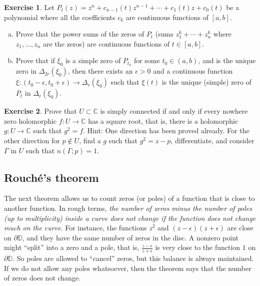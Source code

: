 \documentclass[12pt,openany]{book}
\newcommand{\C}{{\mathbb{C}}}
\newcommand{\D}{{\mathbb{D}}}
\newcommand{\myquote}[1]{``#1''}
\theoremstyle{plain}
\theoremstyle{remark}
\theoremstyle{definition}
\newenvironment{exbox}{%
    \def\FrameCommand{\vrule width 1pt \relax\hspace{10pt}}%
    \MakeFramed{\advance\hsize-\width\FrameRestore}%
}{%
    \endMakeFramed
}
\newenvironment{exparts}{%
    \leavevmode\begin{enumerate}[a),noitemsep,topsep=0pt,parsep=0pt,partopsep=0pt]
}{%
    \end{enumerate}
}
\theoremstyle{exercise}
\newtheorem{exercise}{Exercise}[section]
\theoremstyle{example}
\begin{document}
\begin{exbox}
\begin{exercise}
Let $P_t(z) = z^n + c_{n-1}(t) z^{n-1} + \cdots + c_1(t) z + c_0(t)$
be a polynomial where all the coefficients $c_k$ are continuous functions
of $[a,b]$.
\begin{exparts}
\item
Prove that the power sums of the zeros of $P_t$
(sums $z_1^k+\cdots+z_n^k$ where $z_1,\ldots,z_n$ are the zeros)
are
continuous functions of $t \in [a,b]$.
\item
Prove that if $\xi_0$ is a simple zero of $P_{t_0}$ for some $t_0 \in (a,b)$,
and is the unique zero in
$\Delta_{2r}(\xi_0)$, then
there exists an $\epsilon > 0$ and a continuous function $\xi \colon
(t_0-\epsilon,t_0+\epsilon) \to \Delta_r(\xi_0)$ such that $\xi(t)$
is the unique (simple) zero of $P_t$ in $\Delta_r(\xi_0)$.
\end{exparts}
\end{exercise}

\begin{exercise}
Prove that $U \subset \C$ is simply connected if and only if every nowhere
zero holomorphic $f \colon U \to \C$ has a square root, that is, there is a
holomorphic $g \colon U \to \C$ such that $g^2=f$.  Hint: One direction has
been proved already.  For the other direction for $p \notin U$,
find a $g$ such that $g^2 = z-p$, differentiate, and consider
$\Gamma$ in $U$ such that $n(\Gamma;p) = 1$.
\end{exercise}
\end{exbox}

\subsection{Rouch\'e's theorem}

The next theorem allows us to count zeros (or poles) of a function that is
close to another function.  In rough terms,
\emph{the number of zeros minus the
number of poles (up to multiplicity) inside a curve does not change
if the function does not change much on the curve}.
For instance, the functions $z^2$ and $(z-\epsilon)(z+\epsilon)$
are close on $\partial \D$, and they have the same number of
zeros in the disc.
A nonzero point might \myquote{split} into a zero and a
pole, that is, $\frac{z-\epsilon}{z+\epsilon}$ is very close to the function
$1$ on $\partial \D$.  So poles are allowed to \myquote{cancel} zeros, but this
balance is always maintained.  If we do not allow any poles
whatsoever, then the theorem says that the number of zeros does not change.
\end{document}
